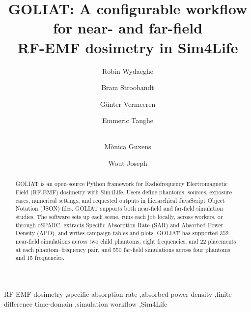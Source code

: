 \documentclass[final,5p,times,twocolumn]{elsarticle}
\begin{document}
\renewcommand{\labelenumii}{\arabic{enumi}.\arabic{enumii}}

\begin{frontmatter}

\ifdefined\SoftwareXPublishedPreview
{}
\fi

\title{GOLIAT: A configurable workflow for near- and far-field\\ RF-EMF dosimetry in Sim4Life}

\author[ugent]{Robin Wydaeghe}
\author[ugent]{Bram Stroobandt}
\author[ugent]{G{\"u}nter Vermeeren}
\author[ugent]{Emmeric Tanghe}
\author[isglobal,icrea,upf,ciberesp,erasmus]{\ifdefined\SoftwareXPublishedPreview\\\fi M{\`o}nica Guxens}
\author[ugent]{Wout Joseph}

\address[ugent]{Department of Information Technology, Ghent University--imec, WAVES Research Group, Technologiepark-Zwijnaarde 126, 9052 Ghent, Belgium}
\address[isglobal]{ISGlobal, Barcelona Institute for Global Health, C/ Doctor Aiguader 88, 08003 Barcelona, Spain}
\address[icrea]{ICREA, Pg.~Llu\'is Companys 23, 08010 Barcelona, Spain}
\address[upf]{Universitat Pompeu Fabra, C/ Doctor Aiguader 88, 08003 Barcelona, Spain}
\address[ciberesp]{Spanish Consortium for Research on Epidemiology and Public Health (CIBERESP), Instituto de Salud Carlos III, Av. de Monforte de Lemos 3--5, 28029 Madrid, Spain}
\address[erasmus]{Department of Child and Adolescent Psychiatry/Psychology, Erasmus MC, University Medical Centre, Dr. Molewaterplein 40, 3015 GD Rotterdam, The Netherlands}

\begin{abstract}
GOLIAT is an open-source Python framework for Radiofrequency Electromagnetic Field (RF-EMF) dosimetry with Sim4Life. Users define phantoms, sources, exposure cases, numerical settings, and requested outputs in hierarchical JavaScript Object Notation (JSON) files. GOLIAT supports both near-field and far-field simulation studies. The software sets up each scene, runs each job locally, across workers, or through oSPARC, extracts Specific Absorption Rate (SAR) and Absorbed Power Density (APD), and writes campaign tables and plots. GOLIAT has supported 352 near-field simulations across two child phantoms, eight frequencies, and 22 placements at each phantom--frequency pair, and 550 far-field simulations across four phantoms and 15 frequencies.
\end{abstract}

\begin{keyword}
RF-EMF dosimetry \sep specific absorption rate \sep absorbed power density \sep finite-difference time-domain \sep simulation workflow \sep Sim4Life
\end{keyword}

\end{frontmatter}
\end{document}
